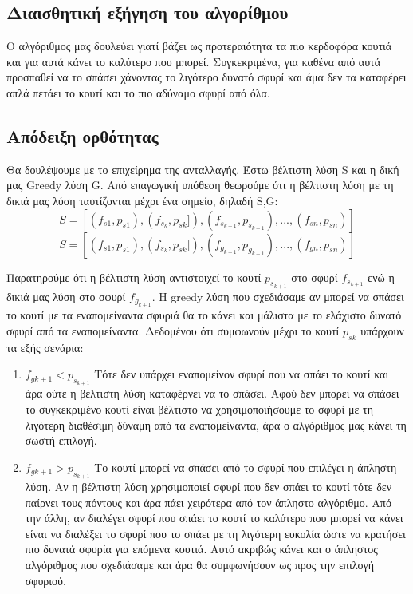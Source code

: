 \documentclass[a4paper,oneside, 11pt]{article}
\begin{document}
\subsection*{Διαισθητική εξήγηση του αλγορίθμου}
Ο αλγόριθμος μας δουλεύει γιατί βάζει ως προτεραιότητα τα πιο κερδοφόρα κουτιά και για αυτά κάνει το καλύτερο που μπορεί. Συγκεκριμένα, για καθένα από αυτά προσπαθεί να το σπάσει χάνοντας το λιγότερο δυνατό σφυρί και άμα δεν τα καταφέρει απλά πετάει το κουτί και το πιο αδύναμο σφυρί από όλα.

\subsection*{Απόδειξη ορθότητας}
Θα δουλέψουμε με το επιχείρημα της ανταλλαγής. Έστω βέλτιστη λύση S και η δική μας Greedy λύση G. Από επαγωγική υπόθεση θεωρούμε ότι η βέλτιστη λύση με τη δικιά μας λύση ταυτίζονται μέχρι ένα σημείο, δηλαδή S,G:
$$S = \left[(f_{s1}, p_{s1}), (f_{s_k}, p_{sk}]), (f_{s_{k+1}}, p_{s_{k+1}}), ..., (f_{sn}, p_{sn})\right]$$
$$S = \left[(f_{s1}, p_{s1}), (f_{s_k}, p_{sk}]), (f_{g_{k+1}}, p_{g_{k+1}}), ..., (f_{gn}, p_{sn})\right]$$

Παρατηρούμε ότι η βέλτιστη λύση αντιστοιχεί το κουτί $p_{s_{k+1}}$ στο σφυρί $f_{s_{k+1}}$ ενώ η δικιά μας λύση στο σφυρί $f_{g_{k+1}}$. Η greedy λύση που σχεδιάσαμε αν μπορεί να σπάσει το κουτί με τα εναπομείναντα σφυριά θα το κάνει και μάλιστα με το ελάχιστο δυνατό σφυρί από τα εναπομείναντα. Δεδομένου ότι συμφωνούν μέχρι το κουτί $p_{sk}$ υπάρχουν τα εξής σενάρια:
\begin{enumerate}
	\item $f_{g{k+1}}  < p_{s_{k+1}}$ \bigbreak
	Τότε δεν υπάρχει εναπομείνον σφυρί που να σπάει το κουτί και άρα ούτε η βέλτιστη λύση καταφέρνει να το σπάσει. Αφού δεν μπορεί να σπάσει το συγκεκριμένο κουτί είναι βέλτιστο να χρησιμοποιήσουμε το σφυρί με τη λιγότερη διαθέσιμη δύναμη από τα εναπομείναντα, άρα ο αλγόριθμος μας κάνει τη σωστή επιλογή.
	\item $f_{g{k+1}}  > p_{s_{k+1}}$ \bigbreak
	Το κουτί μπορεί να σπάσει από το σφυρί που επιλέγει η άπληστη λύση. Αν η βέλτιστη λύση χρησιμοποιεί σφυρί που δεν σπάει το κουτί τότε δεν παίρνει τους πόντους και άρα πάει χειρότερα από τον άπληστο αλγόριθμο. Από την άλλη, αν διαλέγει σφυρί που σπάει το κουτί το καλύτερο που μπορεί να κάνει είναι να διαλέξει το σφυρί που το σπάει με τη λιγότερη ευκολία ώστε να κρατήσει πιο δυνατά σφυρία για επόμενα κουτιά. Αυτό ακριβώς κάνει και ο άπληστος αλγόριθμος που σχεδιάσαμε και άρα θα συμφωνήσουν ως προς την επιλογή σφυριού.
	
\end{enumerate}
\end{document}
